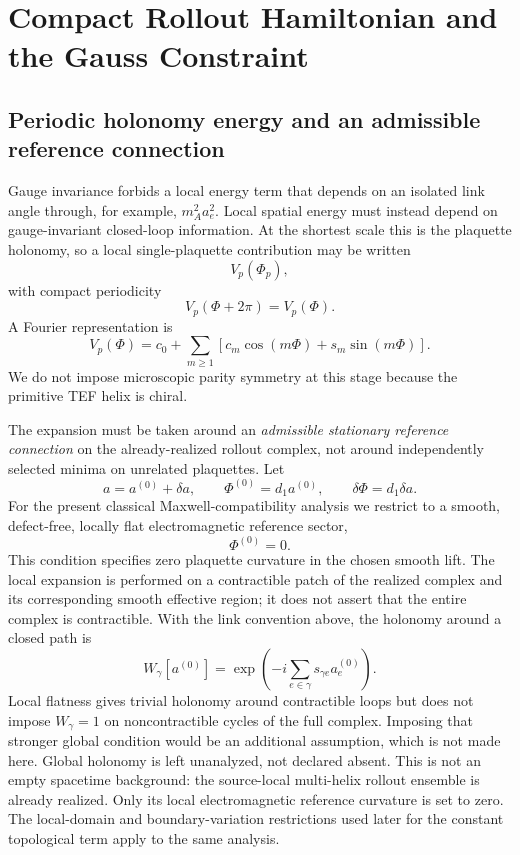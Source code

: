 \documentclass[11pt]{article}
\begin{document}
\section{Compact Rollout Hamiltonian and the Gauss Constraint}

\subsection{Periodic holonomy energy and an admissible reference connection}
\label{sec:reference}

Gauge invariance forbids a local energy term that depends on an isolated link angle through, for example, $m_A^2a_e^2$. Local spatial energy must instead depend on gauge-invariant closed-loop information. At the shortest scale this is the plaquette holonomy, so a local single-plaquette contribution may be written
\begin{equation}
V_p(\Phi_p),
\end{equation}
with compact periodicity
\begin{equation}
\boxed{
V_p(\Phi+2\pi)=V_p(\Phi).
}
\end{equation}
A Fourier representation is
\begin{equation}
V_p(\Phi)
=
c_0
+
\sum_{m\ge1}
\left[
c_m\cos(m\Phi)
+
s_m\sin(m\Phi)
\right].
\end{equation}
We do not impose microscopic parity symmetry at this stage because the primitive TEF helix is chiral.

The expansion must be taken around an \emph{admissible stationary reference connection} on the already-realized rollout complex, not around independently selected minima on unrelated plaquettes. Let
\begin{equation}
a=a^{(0)}+\delta a,
\qquad
\Phi^{(0)}=d_1a^{(0)},
\qquad
\delta\Phi=d_1\delta a.
\end{equation}
For the present classical Maxwell-compatibility analysis we restrict to a smooth, defect-free, locally flat electromagnetic reference sector,
\begin{equation}
\boxed{
\Phi^{(0)}=0.
}
\end{equation}
This condition specifies zero plaquette curvature in the chosen smooth lift. The local expansion is performed on a contractible patch of the realized complex and its corresponding smooth effective region; it does not assert that the entire complex is contractible. With the link convention above, the holonomy around a closed path is
\begin{equation}
W_\gamma[a^{(0)}]=\exp\!\left(-i\sum_{e\in\gamma}s_{\gamma e}a_e^{(0)}\right).
\end{equation}
Local flatness gives trivial holonomy around contractible loops but does not impose $W_\gamma=1$ on noncontractible cycles of the full complex. Imposing that stronger global condition would be an additional assumption, which is not made here. Global holonomy is left unanalyzed, not declared absent. This is not an empty spacetime background: the source-local multi-helix rollout ensemble is already realized. Only its local electromagnetic reference curvature is set to zero. The local-domain and boundary-variation restrictions used later for the constant topological term apply to the same analysis.
\end{document}
